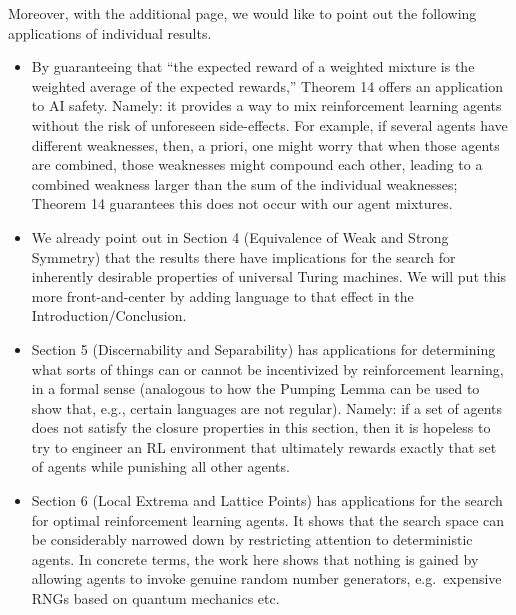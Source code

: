 \documentclass{article}
\begin{document}
Moreover, with the additional page, we would like to point out the following applications of individual results.
\begin{itemize}
    \item
    By guaranteeing that ``the expected reward of a weighted mixture is the weighted
    average of the expected rewards,'' Theorem 14 offers an application to AI safety.
    Namely: it provides a way to mix reinforcement learning agents without the risk of
    unforeseen side-effects. For example, if several agents have different weaknesses,
    then, a priori, one might worry that when those agents are combined, those weaknesses
    might compound each other, leading to a combined weakness larger than the sum of the
    individual weaknesses; Theorem 14
    guarantees this does not occur with our agent mixtures.
    \item
    We already point out in Section 4 (Equivalence of Weak and Strong Symmetry)
    that the results there
    have implications for the search for inherently desirable properties of universal Turing
    machines. We will put this more front-and-center by adding language to that effect in the
    Introduction/Conclusion.
    \item
    Section 5 (Discernability and Separability) has applications for determining what
    sorts of things can or cannot be incentivized by reinforcement learning, in a formal sense 
    (analogous to how the Pumping Lemma can be used to show that, e.g., certain
    languages are not regular). Namely: if a set of agents does not satisfy the
    closure properties in this
    section, then it is hopeless to try to engineer an RL environment that ultimately rewards
    exactly that set of agents while punishing all other agents.
    \item
    Section 6 (Local Extrema and Lattice Points) has applications for the search for
    optimal reinforcement learning agents. It shows that the search space can be
    considerably narrowed down by restricting attention to deterministic agents. In concrete
    terms, the work here shows that nothing is gained by allowing agents to invoke
    genuine random number generators, e.g.\ expensive RNGs based on quantum mechanics etc.
\end{itemize}




\end{document}
